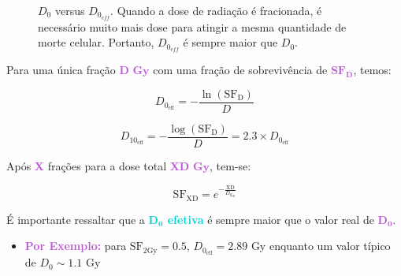 \documentclass[11pt,a4paper]{article}
\begin{document}
	\begin{figure}[h]
		\centering
		\caption{$D_0$ versus $D_{0_{eff}}$. Quando a dose de radiação é fracionada, é necessário muito mais dose para atingir a mesma quantidade de morte celular. Portanto, $D_{0_{eff}}$ é sempre maior que $D_0$.}
		\label{fig:modeloEFracionamento}
	\end{figure}


	Para uma única fração \textcolor{MediumOrchid}{$\mathbf{D \text{ Gy}}$} com uma fração de sobrevivência de \textcolor{MediumOrchid}{$\mathbf{SF_D}$}, temos:

	\begin{equation}
		D_{0_{\text{eff}}} = - \frac{\ln \left(\text{SF}_{\text{D}}\right)}{D}
	\end{equation}

	\begin{equation}
		D_{10_{\text{eff}}} = - \frac{\log \left(\text{SF}_{\text{D}}\right)}{D} = 2.3 \times D_{0_{\text{eff}}}
	\end{equation}

	Após \textcolor{MediumOrchid}{\textbf{X}} frações para a dose total \textcolor{MediumOrchid}{$\mathbf{XD \text{ Gy}}$}, tem-se:

	\begin{equation}
		\text{SF}_{\text{XD}} = e^{-\frac{\text{XD}}{D_{0_{\text{eff}}}}}
	\end{equation}

	É importante ressaltar que a \textcolor{DarkTurquoise}{\textbf{$\mathbf{D_0}$ efetiva}} é sempre maior que o valor real de \textcolor{MediumOrchid}{$\mathbf{D_0}$}.

	\begin{itemize}[label=\textcolor{CarnationPink}{$\blacktriangleright$}]
		\item \textcolor{MediumOrchid}{\LobsterTwo\textbf{Por Exemplo:}} para $\text{SF}_{\text{2Gy}} = 0.5$, $D_{0_{\text{eff}}} = 2.89 \text{ Gy}$ enquanto um valor típico de $D_0 \sim 1.1 \text{ Gy}$
	\end{itemize}
\end{document}
